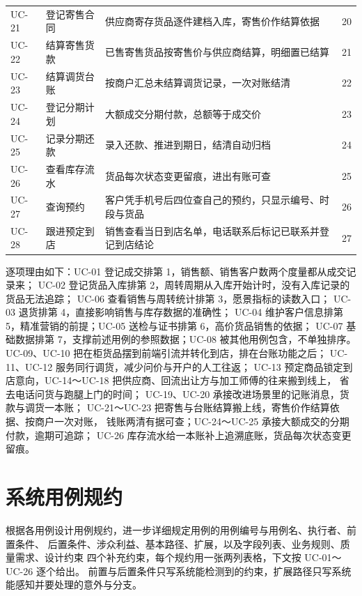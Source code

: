 \begin{table}[H]
\begin{tabularx}{\textwidth}{@{}l l Y c@{}}
UC-21 & 登记寄售合同 & 供应商寄存货品逐件建档入库，寄售价作结算依据 & 20 \\
UC-22 & 结算寄售货款 & 已售寄售货品按寄售价与供应商结算，明细置已结算 & 21 \\
UC-23 & 结算调货台账 & 按商户汇总未结算调货记录，一次对账结清 & 22 \\
UC-24 & 登记分期计划 & 大额成交分期付款，总额等于成交价 & 23 \\
UC-25 & 记录分期还款 & 录入还款、推进到期日，结清自动归档 & 24 \\
UC-26 & 查看库存流水 & 货品每次状态变更留痕，进出有账可查 & 25 \\
UC-27 & 查询预约 & 客户凭手机号后四位查自己的预约，只显示编号、时段与货品 & 26 \\
UC-28 & 跟进预定到店 & 销售查看当日到店名单，电话联系后标记已联系并登记到店结论 & 27 \\
\bottomrule
\end{tabularx}
\end{table}

\noindent
逐项理由如下：UC-01 登记成交排第 1，销售额、销售客户数两个度量都从成交记录来；
UC-02 登记货品入库排第 2，周转周期从入库开始计时，没有入库记录的货品无法追踪；
UC-06 查看销售与周转统计排第 3，愿景指标的读数入口；
UC-03 退货排第 4，直接影响销售与库存数据的准确性；
UC-04 维护客户信息排第 5，精准营销的前提；UC-05 送检与证书排第 6，高价货品销售的依据；
UC-07 基础数据排第 7，支撑前述用例的参照数据；UC-08 被其他用例包含，不单独排序。
UC-09、UC-10 把在柜货品摆到前端引流并转化到店，排在台账功能之后；
UC-11、UC-12 服务同行调货，减少问价与开户的人工往返；
UC-13 预定商品锁定到店意向，UC-14～UC-18 把供应商、回流出让方与加工师傅的往来搬到线上，
省去电话问货与跑腿上门的时间；
UC-19、UC-20 承接改进场景里的记账消息，货款与调货一本账；
UC-21～UC-23 把寄售与台账结算搬上线，寄售价作结算依据、按商户一次对账，
钱账两清有据可查；UC-24～UC-25 承接大额成交的分期付款，逾期可追踪；
UC-26 库存流水给一本账补上追溯底账，货品每次状态变更留痕。

\section{系统用例规约}

根据各用例设计用例规约，进一步详细规定用例的用例编号与用例名、执行者、前置条件、
后置条件、涉众利益、基本路径、扩展，以及字段列表、业务规则、质量需求、设计约束
四个补充约束，每个规约用一张两列表格，下文按 UC-01～UC-26 逐个给出。
前置与后置条件只写系统能检测到的约束，扩展路径只写系统能感知并要处理的意外与分支。

